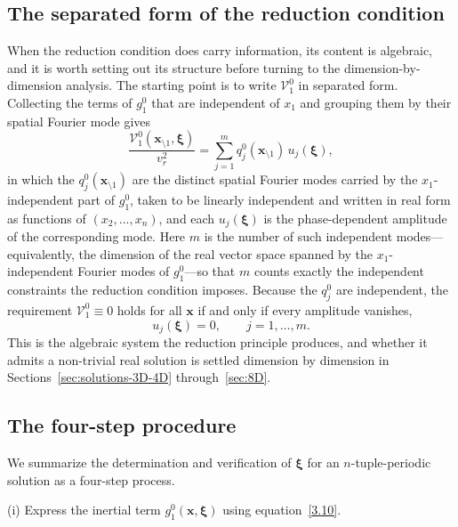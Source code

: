 \documentclass[11pt]{jfm}
\numberwithin{equation}{section}
\begin{document}
\subsection{The separated form of the reduction condition}
\label{subsec:separated}
When the reduction condition does carry information, its content is algebraic, and it is worth
setting out its structure before turning to the dimension-by-dimension analysis. The starting point is to
write $\mathcal{V}_1^0$ in separated form. Collecting the terms of $g_1^0$ that are independent
of $x_1$ and grouping them by their spatial Fourier mode gives
\begin{equation}
\label{3.19}
    \frac{\mathcal{V}_1^0(\boldsymbol{x}_{\setminus 1}, \boldsymbol{\xi})}{v_r^2} = \sum_{j=1}^m q_j^0(\boldsymbol{x}_{\setminus 1})\, u_j(\boldsymbol{\xi}),
\end{equation}
in which the $q_j^0(\boldsymbol{x}_{\setminus 1})$ are the distinct spatial Fourier modes
carried by the $x_1$-independent part of $g_1^0$, taken to be linearly independent and written
in real form as functions of $(x_2,\dots,x_n)$, and each $u_j(\boldsymbol{\xi})$ is the
phase-dependent amplitude of the corresponding mode. Here $m$ is the number of such independent
modes---equivalently, the dimension of the real vector space spanned by the $x_1$-independent
Fourier modes of $g_1^0$---so that $m$ counts exactly the independent constraints the reduction
condition imposes. Because the $q_j^0$ are
independent, the requirement $\mathcal V_1^0\equiv0$ holds for all $\boldsymbol{x}$ if and only
if every amplitude vanishes,
\begin{equation}
\label{3.20}
u_j(\boldsymbol{\xi}) = 0, \qquad j = 1,\dots,m .
\end{equation}
This is the algebraic system the reduction principle produces, and whether it admits a non-trivial
real solution is settled dimension by dimension in
Sections~\ref{sec:solutions-3D-4D} through~\ref{sec:8D}.

\subsection{The four-step procedure}
\label{subsec:fourstep}
\label{subsec:procedure}
We summarize the determination and verification of \( \boldsymbol{\xi} \) for an $n$-tuple-periodic solution as a four-step process.

\noindent (i) Express the inertial term $g_1^0(\boldsymbol{x}, \boldsymbol{\xi})$ using equation~\eqref{3.10}.
\end{document}
